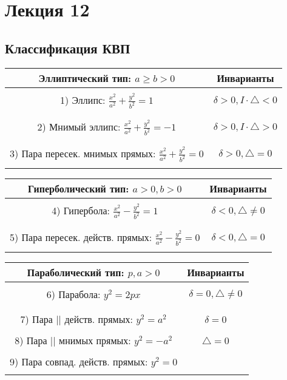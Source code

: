 \section{Лекция 12}
\subsection{Классификация КВП}
\begin{center}
\begin{tabular}{ |c|c| } 
 \hline
 Эллиптический тип: $a \geq b > 0$ & Инварианты \\
 \hline & \\
 1) Эллипс: $\frac{x^{2}}{a^{2}} + \frac{y^{2}}{b^{2}} = 1$ & $\delta > 0, I \cdot \triangle < 0$ \\ & \\
 \hline& \\
  2) Мнимый эллипс: $\frac{x^{2}}{a^{2}} + \frac{y^{2}}{b^{2}} = -1$ & $\delta > 0, I \cdot \triangle > 0$ \\& \\
 \hline& \\
 3) Пара пересек. мнимых прямых: $\frac{x^{2}}{a^{2}} + \frac{y^{2}}{b^{2}} = 0$ & $\delta > 0, \triangle = 0$ \\ & \\
 \hline
\end{tabular}
\end{center}
\begin{center}
\begin{tabular}{ |c|c| } 
 \hline
  Гиперболический тип: $a > 0, b > 0$ & Инварианты \\
 \hline& \\
 4) Гипербола: $\frac{x^{2}}{a^{2}} - \frac{y^{2}}{b^{2}} = 1$ & $\delta < 0, \triangle \neq 0$  \\ & \\
 \hline& \\
 5) Пара пересек. действ. прямых: $\frac{x^{2}}{a^{2}} - \frac{y^{2}}{b^{2}} = 0$ & $\delta < 0, \triangle = 0$ \\ & \\
 \hline
\end{tabular}
\end{center}
\begin{center}
\begin{tabular}{ |c|c| } 
 \hline
 Параболический тип: $p, a > 0$ & Инварианты \\
 \hline& \\
 6) Парабола: $y^{2} = 2px$ & $\delta = 0, \triangle \neq 0$ \\& \\
 \hline& \\
 7) Пара || действ. прямых: $y^{2} = a^{2}$ & $\delta = 0$ \\ &\\
 8) Пара || мнимых прямых: $y^{2} = -a^{2}$ &$\triangle = 0$ \\ &\\
 9) Пара совпад. действ. прямых: $y^{2} = 0$ &  \\ & \\
 \hline
\end{tabular}
\end{center}
